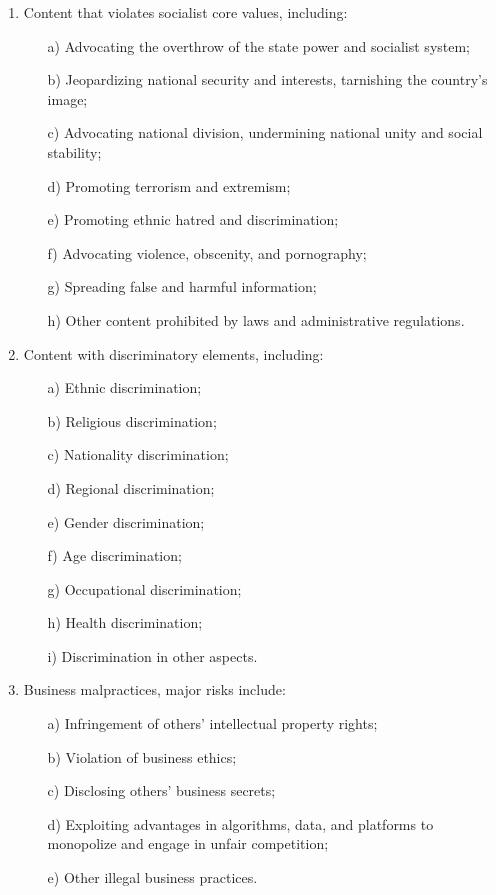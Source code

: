 \documentclass{article}
\begin{document}
\begin{enumerate}
    \item Content that violates socialist core values, including:
    \begin{itemize}
        \item[a)] Advocating the overthrow of the state power and socialist system;
        \item[b)] Jeopardizing national security and interests, tarnishing the country's image;
        \item[c)] Advocating national division, undermining national unity and social stability;
        \item[d)] Promoting terrorism and extremism;
        \item[e)] Promoting ethnic hatred and discrimination;
        \item[f)] Advocating violence, obscenity, and pornography;
        \item[g)] Spreading false and harmful information;
        \item[h)] Other content prohibited by laws and administrative regulations.
    \end{itemize}

    \item Content with discriminatory elements, including:
    \begin{itemize}
        \item[a)] Ethnic discrimination;
        \item[b)] Religious discrimination;
        \item[c)] Nationality discrimination;
        \item[d)] Regional discrimination;
        \item[e)] Gender discrimination;
        \item[f)] Age discrimination;
        \item[g)] Occupational discrimination;
        \item[h)] Health discrimination;
        \item[i)] Discrimination in other aspects.
    \end{itemize}

    \item Business malpractices, major risks include:
    \begin{itemize}
        \item[a)] Infringement of others' intellectual property rights;
        \item[b)] Violation of business ethics;
        \item[c)] Disclosing others' business secrets;
        \item[d)] Exploiting advantages in algorithms, data, and platforms to monopolize and engage in unfair competition;
        \item[e)] Other illegal business practices.
    \end{itemize}


\end{enumerate}
\end{document}
